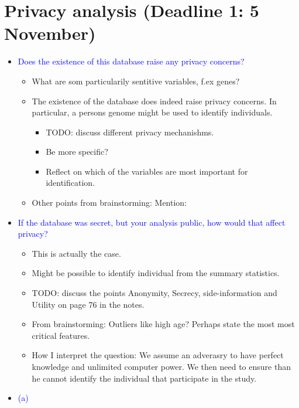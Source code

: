 
\section*{Privacy analysis (Deadline 1: 5 November)}
\begin{itemize}
    \item \textcolor{blue}{Does the existence of this database raise any privacy concerns?}
        \begin{itemize}
            \item What are som particularily sentitive variables, f.ex genes?
            \item The existence of the database does indeed raise privacy concerns. 
            In particular, a persons genome might be used to identify individuals. 
            \begin{itemize}
                \item TODO: discuss different privacy mechanishms. 
                \item Be more specific?
                \item Reflect on which of the variables are most important for identification. 
            \end{itemize}
            \item Other points from brainstorming: Mention: 
        \end{itemize}
    \item \textcolor{blue}{If the database was secret, but your analysis public, how would that affect privacy?}
        \begin{itemize}
            \item This is actually the case. 
            \item Might be possible to identify individual from the summary statistics. 
            \item TODO: discuss the points Anonymity, Secrecy, side-information and Utility on page 76 in the notes. 
            \item From brainstorming: Outliers like high age? Perhaps state the most most critical features. 
            \item How I interpret the question: We assume an adverasry to have perfect knowledge and unlimited computer power. 
            We then need to ensure than he cannot identify the individual that participate in the study. 
        \end{itemize}
    \item \textcolor{blue}{(a)}
        \begin{itemize}

\end{itemize}
\end{itemize}
